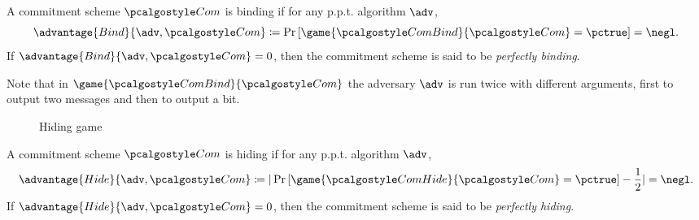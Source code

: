 \begin{definition}[Binding]
  A commitment scheme $\algo{Com}$ is binding if for any p.p.t. algorithm $\adv$,
 \[
  \advantage{Bind}{\adv, \algo{Com}} \defeq \pr{\game{\algo{ComBind}}{\algo{Com}} = \pctrue} = \negl.
 \]
 If $\advantage{Bind}{\adv, \algo{Com}} = 0$, then the commitment scheme is said to be \emph{perfectly binding}.
\end{definition}

Note that in $\game{\algo{ComBind}}{\algo{Com}}$ the adversary $\adv$ is run twice with different arguments, first to output two messages and then to output a bit.

\begin{figure}[tbhp]
  \begin{center}
    \begin{tcolorbox}[width=8cm]
      \begin{pchstack}[center]
      \end{pchstack}
    \end{tcolorbox}
  \end{center}
  \caption{Hiding game \label{fig:break-com-hid}}
\end{figure}

\begin{definition}[Hiding]
  A commitment scheme $\algo{Com}$ is hiding if for any p.p.t. algorithm $\adv$,
 \[
  \advantage{Hide}{\adv, \algo{Com}} \defeq |\pr{\game{\algo{ComHide}}{\algo{Com}} = \pctrue} - \frac{1}{2}| = \negl.
 \]
 If $\advantage{Hide}{\adv, \algo{Com}} = 0$, then the commitment scheme is said to be \emph{perfectly hiding}.
\end{definition}


